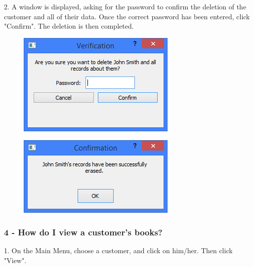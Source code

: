 2. A window is displayed, asking for the password to confirm the deletion of the customer and all of their data. Once the correct password has been entered, click "Confirm". The deletion is then completed.

\begin{figure}[H]
    \includegraphics[width=\textwidth]{./Manual/Tutorial/Q3/Verification.png}
\end{figure}

\begin{figure}[H]
    \includegraphics[width=\textwidth]{./Manual/Tutorial/Q3/Erased.png}
\end{figure}

\subsubsection{4 -  How do I view a customer's books?}

1. On the Main Menu, choose a customer, and click on him/her. Then click "View".

